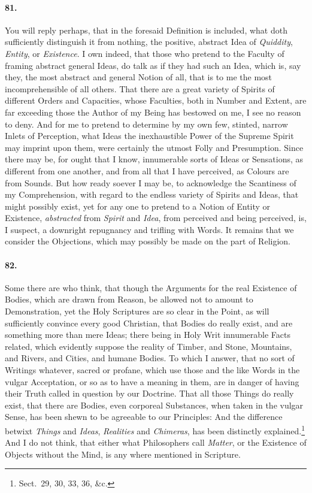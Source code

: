\documentclass[]{article}
\newcounter{authornote}[page]
\newcommand*{\authornote}[1]{\renewcommand{\thefootnote}{\fnsymbol{footnote}}\stepcounter{authornote}\footnote[\value{authornote}]{#1}\renewcommand{\thefootnote}{\arabic{footnote}}}
\newenvironment{sectionbody}{\begin{multicols}{2}}{\end{multicols}}
\begin{document}
\begin{sectionbody}
\paragraph{81.} You will reply perhaps, that in the foresaid Definition is
included, what doth sufficiently distinguish it from nothing, the
positive, abstract Idea of \emph{Quiddity}, \emph{Entity}, or
\emph{Existence}.  I own indeed, that those who pretend to the
Faculty of framing abstract general Ideas, do talk as if they had
such an Idea, which is, say they, the most abstract and general
Notion of all, that is to me the most incomprehensible of all
others.  That there are a great variety of Spirits of different
Orders and Capacities, whose Faculties, both in Number and
Extent, are far exceeding those the Author of my Being has
bestowed on me, I see no reason to deny.  And for me to pretend
to determine by my own few, stinted, narrow Inlets of Perception,
what Ideas the inexhaustible Power of the {\sc Supreme Spirit} may
imprint upon them, were certainly the utmost Folly and
Presumption.  Since there may be, for ought that I know,
innumerable sorts of Ideas or Sensations, as different from one
another, and from all that I have perceived, as Colours are from
Sounds.  But how ready soever I may be, to acknowledge the
Scantiness of my Comprehension, with regard to the endless
variety of Spirits and Ideas, that might possibly exist, yet for
any one to pretend to a Notion of Entity or Existence,
\emph{abstracted} from \emph{Spirit} and \emph{Idea}, from
perceived and being perceived, is, I suspect, a downright
repugnancy and trifling with Words.  It remains that we consider
the Objections, which may possibly be made on the part of
Religion.



\paragraph{82.} Some there are who think, that though the Arguments for the real
Existence of Bodies, which are drawn from Reason, be allowed not
to amount to Demonstration, yet the Holy Scriptures are so clear
in the Point, as will sufficiently convince every good Christian,
that Bodies do really exist, and are something more than mere
Ideas; there being in Holy Writ innumerable Facts related, which
evidently suppose the reality of Timber, and Stone, Mountains,
and Rivers, and Cities, and humane Bodies.  To which I answer,
that no sort of Writings whatever, sacred or profane, which use
those and the like Words in the vulgar Acceptation, or so as to
have a meaning in them, are in danger of having their Truth
called in question by our Doctrine.  That all those Things do
really exist, that there are Bodies, even corporeal Substances,
when taken in the vulgar Sense, has been shewn to be agreeable to
our Principles: And the difference betwixt \emph{Things} and
\emph{Ideas}, \emph{Realities} and \emph{Chimeras}, has
been distinctly explained.\authornote{Sect.\ 29, 30, 33, 36, \&c.}
And I do not think, that either what Philosophers call
\emph{Matter}, or the Existence of Objects without the Mind, is
any where mentioned in Scripture.




\end{sectionbody}
\end{document}
